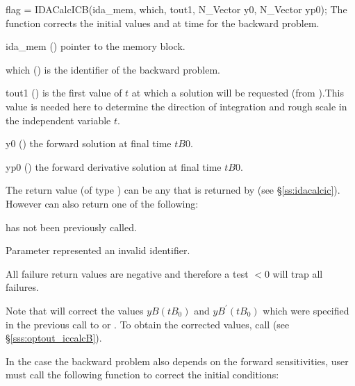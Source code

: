 {
  flag = IDACalcICB(ida\_mem, which, tout1, N\_Vector y0, N\_Vector yp0);
}
{
  The function  corrects the initial values  and  at
  time  for the backward problem.
}
{
  \begin{args}
  \item[ida\_mem] ()
    pointer to the {\idas} memory block.
  \item[which] ()
    is the identifier of the backward problem.
  \item[tout1] ()
    is the first value of $t$ at which a solution will be requested (from
    ).This value is needed here to determine the direction of
    integration and rough scale in the independent variable $t$.   
  \item[y0] ()
    the forward solution at final time $tB0$.
  \item[yp0] ()
    the forward derivative solution at final time $tB0$.
  \end{args}
}
{
  The return value  (of type ) can be any that is returned by 
   (see \S\ref{ss:idacalcic}). However  can also 
  return one of the following:

  \begin{args}
  \item[\Id{IDA\_NO\_ADJ}]
     has not been previously called.
  \item[\id{IDA\_ILL\_INPUT}]
    Parameter  represented an invalid identifier.
  \end{args} 
}
{
  All failure return values are negative and therefore a test  $< 0$
  will trap all  failures.

  Note that  will correct the values $yB(tB_0)$ and 
  $yB^\prime(tB_0)$ which were specified in the previous call to  
  or . To obtain the corrected values, call 
   (see \S\ref{sss:optout_iccalcB}).
}

In the case the backward problem also depends on the forward sensitivities, 
user must call the following function to correct the initial conditions:

